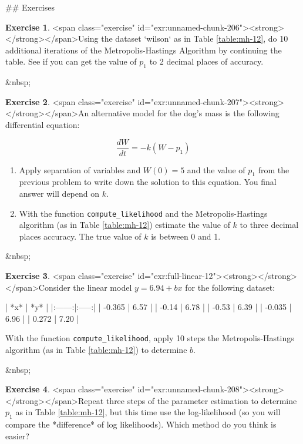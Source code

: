 \documentclass[
]{book}
\theoremstyle{definition}
\theoremstyle{definition}
\theoremstyle{definition}
\newtheorem{exercise}{Exercise}[chapter]
\theoremstyle{remark}
\begin{document}
\newpage

## Exercises

\begin{exercise}
<span class="exercise" id="exr:unnamed-chunk-206"><strong>\label{exr:unnamed-chunk-206} </strong></span>Using the dataset `wilson` as in Table \ref{table:mh-12}, do 10 additional iterations of the Metropolis-Hastings Algorithm by continuing the table.  See if you can get the value of $p_{1}$ to 2 decimal places of accuracy.
\end{exercise}
&nbsp;


\begin{exercise}
<span class="exercise" id="exr:unnamed-chunk-207"><strong>\label{exr:unnamed-chunk-207} </strong></span>An alternative model for the dog's mass is the following differential equation:

\begin{equation}
\frac{dW}{dt} = -k (W-p_{1})
\end{equation}

\begin{enumerate}[label=\alph*.]
\item Apply separation of variables and $W(0)=5$ and the value of $p_{1}$ from the previous problem to write down the solution to this equation.  You final answer will depend on $k$.
\item With the function \texttt{compute\_likelihood} and the Metropolis-Hastings algorithm (as in Table \ref{table:mh-12}) estimate the value of $k$ to three decimal places accuracy.  The true value of $k$ is between 0 and 1.
\end{enumerate}
\end{exercise}
&nbsp;

\begin{exercise}
<span class="exercise" id="exr:full-linear-12"><strong>\label{exr:full-linear-12} </strong></span>Consider the linear model $y=6.94+bx$ for the following dataset:


| *x* | *y*  | 
|:------:|:-----:|
| -0.365 | 6.57 |
| -0.14 | 6.78 |
| -0.53 | 6.39 |
| -0.035 | 6.96 |
| 0.272 | 7.20 |
  
With the function \texttt{compute\_likelihood}, apply 10 steps the Metropolis-Hastings algorithm (as in Table \ref{table:mh-12}) to determine $b$.
\end{exercise}

&nbsp;

\begin{exercise}
<span class="exercise" id="exr:unnamed-chunk-208"><strong>\label{exr:unnamed-chunk-208} </strong></span>Repeat three steps of the parameter estimation to determine $p_{1}$ as in Table \ref{table:mh-12}, but this time use the log-likelihood (so you will compare the *difference* of log likelihoods). Which method do you think is easier?
\end{exercise}
\end{document}
